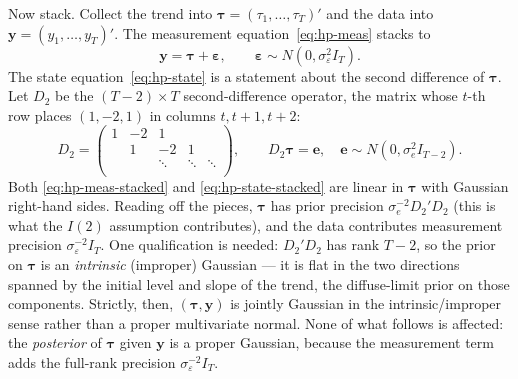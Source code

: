 \documentclass[11pt]{article}
\begin{document}
Now stack.  Collect the trend into $\bm\tau=(\tau_1,\dots,\tau_T)'$ and
the data into $\bm y=(y_1,\dots,y_T)'$.  The measurement
equation~\eqref{eq:hp-meas} stacks to
\begin{equation}
\bm y = \bm\tau + \bm\varepsilon, \qquad \bm\varepsilon\sim N(0,\sigma_\varepsilon^2 I_T).
\label{eq:hp-meas-stacked}
\end{equation}
The state equation~\eqref{eq:hp-state} is a statement about the second
difference of $\bm\tau$.  Let $D_2$ be the $(T-2)\times T$
second-difference operator, the matrix whose $t$-th row places
$(1,-2,1)$ in columns $t,t+1,t+2$:
\begin{equation}
D_2=\begin{pmatrix}
1 & -2 & 1 & & \\
  & 1 & -2 & 1 & \\
  &   & \ddots & \ddots & \ddots \\
\end{pmatrix},
\qquad
D_2\bm\tau = \bm e,\quad \bm e\sim N(0,\sigma_e^2 I_{T-2}).
\label{eq:hp-state-stacked}
\end{equation}
Both \eqref{eq:hp-meas-stacked} and \eqref{eq:hp-state-stacked} are
linear in $\bm\tau$ with Gaussian right-hand sides.  Reading off the
pieces, $\bm\tau$ has prior precision $\sigma_e^{-2}D_2'D_2$ (this is
what the $I(2)$ assumption contributes), and the data contributes
measurement precision $\sigma_\varepsilon^{-2}I_T$.  One qualification
is needed: $D_2'D_2$ has rank $T-2$, so the prior on $\bm\tau$ is an
\emph{intrinsic} (improper) Gaussian --- it is flat in the two
directions spanned by the initial level and slope of the trend, the
diffuse-limit prior on those components.  Strictly, then,
$(\bm\tau,\bm y)$ is jointly Gaussian in the intrinsic/improper sense
rather than a proper multivariate normal.  None of what follows is
affected: the \emph{posterior} of $\bm\tau$ given $\bm y$ is a proper
Gaussian, because the measurement term adds the full-rank precision
$\sigma_\varepsilon^{-2}I_T$.
\end{document}
